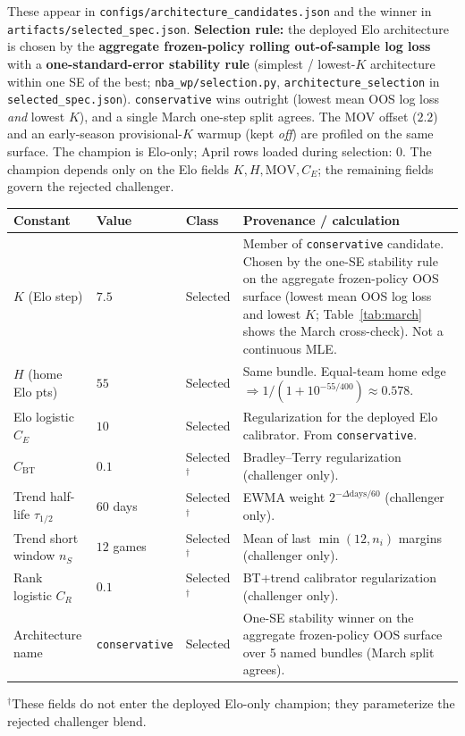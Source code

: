 \documentclass[10pt]{article}
\newcommand{\code}[1]{\texttt{#1}}
\begin{document}
These appear in \code{configs/architecture\_candidates.json} and the winner in
\code{artifacts/selected\_spec.json}.
\textbf{Selection rule:} the deployed Elo architecture is chosen by the
\textbf{aggregate frozen-policy rolling out-of-sample log loss} with a
\textbf{one-standard-error stability rule} (simplest / lowest-\(K\) architecture
within one SE of the best; \code{nba\_wp/selection.py},
\code{architecture\_selection} in \code{selected\_spec.json}). \texttt{conservative}
wins outright (lowest mean OOS log loss \emph{and} lowest \(K\)), and a single
March one-step split agrees. The MOV offset (\(2.2\)) and an early-season
provisional-\(K\) warmup (kept \emph{off}) are profiled on the same surface. The
champion is Elo-only; April rows loaded during selection: \(0\). The champion
depends only on the Elo fields \(K,H,\text{MOV},C_E\); the remaining fields govern
the rejected challenger.

\begin{longtable}{@{}>{\raggedright\arraybackslash}p{1.35in}
>{\raggedright\arraybackslash}p{0.55in}
>{\raggedright\arraybackslash}p{0.72in}
>{\raggedright\arraybackslash}p{3.5in}@{}}
\toprule
\textbf{Constant} & \textbf{Value} & \textbf{Class} & \textbf{Provenance / calculation} \\
\midrule
\endhead
\(K\) (Elo step) & \(7.5\) & Selected & Member of \texttt{conservative} candidate. Chosen by the one-SE stability rule on the aggregate frozen-policy OOS surface (lowest mean OOS log loss and lowest \(K\); Table~\ref{tab:march} shows the March cross-check). Not a continuous MLE. \\
\(H\) (home Elo pts) & \(55\) & Selected & Same bundle. Equal-team home edge \(\Rightarrow 1/(1+10^{-55/400})\approx 0.578\). \\
Elo logistic \(C_E\) & \(10\) & Selected & Regularization for the deployed Elo calibrator. From \texttt{conservative}. \\
\(C_{\mathrm{BT}}\) & \(0.1\) & Selected$^\dagger$ & Bradley--Terry regularization (challenger only). \\
Trend half-life \(\tau_{1/2}\) & \(60\) days & Selected$^\dagger$ & EWMA weight \(2^{-\Delta\mathrm{days}/60}\) (challenger only). \\
Trend short window \(n_S\) & \(12\) games & Selected$^\dagger$ & Mean of last \(\min(12,n_i)\) margins (challenger only). \\
Rank logistic \(C_R\) & \(0.1\) & Selected$^\dagger$ & BT+trend calibrator regularization (challenger only). \\
Architecture name & \texttt{conservative} & Selected & One-SE stability winner on the aggregate frozen-policy OOS surface over 5 named bundles (March split agrees). \\
\bottomrule
\end{longtable}
{\footnotesize $^\dagger$These fields do not enter the deployed Elo-only champion; they parameterize the rejected challenger blend.}
\end{document}
